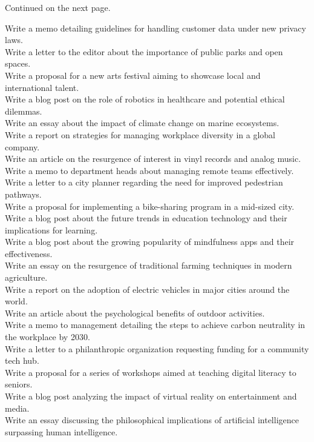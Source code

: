 Continued on the next page.

\begin{examplebox}
\small
Write a memo detailing guidelines for handling customer data under new privacy laws. \\
Write a letter to the editor about the importance of public parks and open spaces. \\
Write a proposal for a new arts festival aiming to showcase local and international talent.\\
Write a blog post on the role of robotics in healthcare and potential ethical dilemmas. \\
Write an essay about the impact of climate change on marine ecosystems.\\
Write a report on strategies for managing workplace diversity in a global company. \\
Write an article on the resurgence of interest in vinyl records and analog music. \\
Write a memo to department heads about managing remote teams effectively.\\
Write a letter to a city planner regarding the need for improved pedestrian pathways.\\
Write a proposal for implementing a bike-sharing program in a mid-sized city. \\
Write a blog post about the future trends in education technology and their implications for learning. \\
Write a blog post about the growing popularity of mindfulness apps and their effectiveness. \\
Write an essay on the resurgence of traditional farming techniques in modern agriculture. \\
Write a report on the adoption of electric vehicles in major cities around the world. \\
Write an article about the psychological benefits of outdoor activities. \\
Write a memo to management detailing the steps to achieve carbon neutrality in the workplace by 2030. \\
Write a letter to a philanthropic organization requesting funding for a community tech hub. \\
Write a proposal for a series of workshops aimed at teaching digital literacy to seniors. \\
Write a blog post analyzing the impact of virtual reality on entertainment and media. \\
Write an essay discussing the philosophical implications of artificial intelligence surpassing human intelligence. \\

\end{examplebox}
